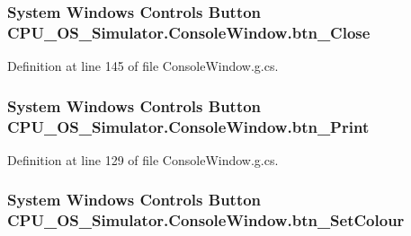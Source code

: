 \subsubsection[{btn\+\_\+\+Close}]{\setlength{\rightskip}{0pt plus 5cm}System Windows Controls Button C\+P\+U\+\_\+\+O\+S\+\_\+\+Simulator.\+Console\+Window.\+btn\+\_\+\+Close\hspace{0.3cm}{\ttfamily [package]}}\label{class_c_p_u___o_s___simulator_1_1_console_window_a532cd67c30fdb581d7f7cdccacb388ff}


Definition at line 145 of file Console\+Window.\+g.\+cs.

\hypertarget{class_c_p_u___o_s___simulator_1_1_console_window_a2121b0cebbdb2d27c54073ff8dc4bb8e}{}
\subsubsection[{btn\+\_\+\+Print}]{\setlength{\rightskip}{0pt plus 5cm}System Windows Controls Button C\+P\+U\+\_\+\+O\+S\+\_\+\+Simulator.\+Console\+Window.\+btn\+\_\+\+Print\hspace{0.3cm}{\ttfamily [package]}}\label{class_c_p_u___o_s___simulator_1_1_console_window_a2121b0cebbdb2d27c54073ff8dc4bb8e}


Definition at line 129 of file Console\+Window.\+g.\+cs.

\hypertarget{class_c_p_u___o_s___simulator_1_1_console_window_a374a86e391068f8d05edb9649ce3d7f4}{}
\subsubsection[{btn\+\_\+\+Set\+Colour}]{\setlength{\rightskip}{0pt plus 5cm}System Windows Controls Button C\+P\+U\+\_\+\+O\+S\+\_\+\+Simulator.\+Console\+Window.\+btn\+\_\+\+Set\+Colour\hspace{0.3cm}{\ttfamily [package]}}\label{class_c_p_u___o_s___simulator_1_1_console_window_a374a86e391068f8d05edb9649ce3d7f4}


